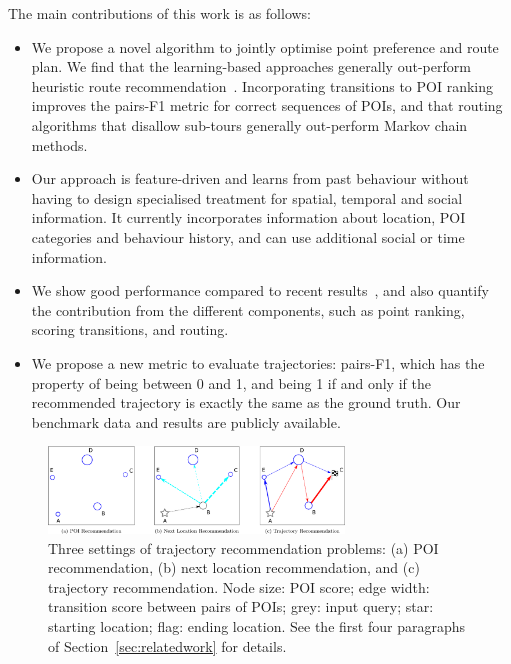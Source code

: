 The main contributions of this work is as follows:
\begin{itemize}
\setlength{\itemsep}{-2pt}
\item We propose a novel algorithm to jointly optimise point preference and route plan.
  We find that the learning-based approaches generally out-perform heuristic route recommendation~\cite{ijcai15}. Incorporating transitions to POI ranking improves the pairs-F1 metric for correct sequences of POIs, and that routing algorithms that disallow sub-tours generally out-perform Markov chain methods.
\item Our approach is feature-driven and learns from past behaviour without having to design specialised treatment for spatial, temporal and social information. It currently incorporates information about location, POI categories and behaviour history, and can use additional social or time information.%
\item We show good performance compared to recent results~\cite{ijcai15}, and also quantify the contribution from the different components, such as point ranking, scoring transitions, and routing.
\item We propose a new metric to evaluate trajectories: pairs-F1, which has the property of being between 0 and 1, and being 1 if and only if the recommended trajectory is exactly the same as the ground truth. Our benchmark data and results are publicly available.
\end{itemize}

\begin{figure}[ht]
	\centering
	\includegraphics[width=0.7\textwidth]{fig/fig1-flavours.pdf}
	\caption{Three settings of trajectory recommendation problems: (a) POI recommendation, (b) next location recommendation, and (c) trajectory recommendation. Node size: POI score; edge width: transition score between pairs of POIs; grey: input query; star: starting location; flag: ending location. See the first four paragraphs of Section~\ref{sec:relatedwork} for details.
}
	\label{fig:threesettings}
\end{figure}
